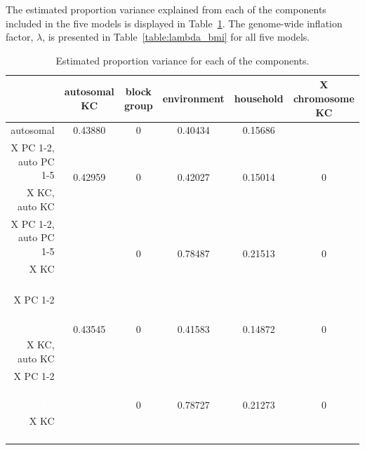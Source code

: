 \documentclass[11pt]{article} %
\begin{document}
The estimated proportion variance explained from each of the components included in the five models is displayed in Table~\ref{table:varComp_bmi}. 
The genome-wide inflation factor, $\lambda$, is presented in Table~\ref{table:lambda_bmi} for all five models.


\begin{table}[h!]
\centering
\begin{tabular}{r|ccccc}
  \hline
 & autosomal KC & block group & environment & household & X chromosome KC  \\
  \hline
autosomal & 0.43880 & 0 & 0.40434 & 0.15686 & \\ \hline
X PC 1-2, auto PC 1-5&\multirow{2}{*}{0.42959} & \multirow{2}{*}{0} & \multirow{2}{*}{0.42027} & \multirow{2}{*}{0.15014} & \multirow{2}{*}{0 } \\ 
X KC, auto KC & & \\ \hline
X PC 1-2, auto PC 1-5 & \multirow{2}{*}{} & \multirow{2}{*}{0} & \multirow{2}{*}{0.78487} & \multirow{2}{*}{0.21513} & \multirow{2}{*}{0} \\
X KC \textcolor{white}{auto KC} & & \\ \hline
X PC 1-2 \textcolor{white}{auto PC 1-5}& \multirow{2}{*}{0.43545} & \multirow{2}{*}{0}& \multirow{2}{*}{0.41583}& \multirow{2}{*}{0.14872}& \multirow{2}{*}{0} \\
X KC, auto KC & & \\ \hline
X PC 1-2 \textcolor{white}{auto PC 1-5} & \multirow{2}{*}{} & \multirow{2}{*}{0} & \multirow{2}{*}{0.78727}& \multirow{2}{*}{0.21273}& \multirow{2}{*}{0}\\
X KC \textcolor{white}{auto KC} & & \\ \hline 
\end{tabular}
\caption{Estimated proportion variance for each of the components.}
\label{table:varComp_bmi}
\end{table}
\end{document}
